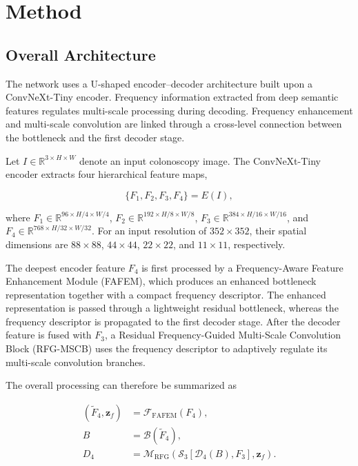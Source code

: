 \section{Method}

\subsection{Overall Architecture}

The network uses a U-shaped encoder--decoder architecture built upon a ConvNeXt-Tiny encoder. Frequency information extracted from deep semantic features regulates multi-scale processing during decoding. Frequency enhancement and multi-scale convolution are linked through a cross-level connection between the bottleneck and the first decoder stage.

Let $I \in \mathbb{R}^{3\times H\times W}$ denote an input colonoscopy image. The ConvNeXt-Tiny encoder extracts four hierarchical feature maps,

\begin{equation}
\{F_1,F_2,F_3,F_4\}=E(I),
\label{eq:encoder_features}
\end{equation}

where $F_1\in\mathbb{R}^{96\times H/4\times W/4}$, $F_2\in\mathbb{R}^{192\times H/8\times W/8}$, $F_3\in\mathbb{R}^{384\times H/16\times W/16}$, and $F_4\in\mathbb{R}^{768\times H/32\times W/32}$. For an input resolution of $352\times352$, their spatial dimensions are $88\times88$, $44\times44$, $22\times22$, and $11\times11$, respectively.

The deepest encoder feature $F_4$ is first processed by a Frequency-Aware Feature Enhancement Module (FAFEM), which produces an enhanced bottleneck representation together with a compact frequency descriptor. The enhanced representation is passed through a lightweight residual bottleneck, whereas the frequency descriptor is propagated to the first decoder stage. After the decoder feature is fused with $F_3$, a Residual Frequency-Guided Multi-Scale Convolution Block (RFG-MSCB) uses the frequency descriptor to adaptively regulate its multi-scale convolution branches.

The overall processing can therefore be summarized as

\begin{align}
(\widetilde{F}_4,\mathbf{z}_f)
&=\mathcal{F}_{\mathrm{FAFEM}}(F_4),
\label{eq:overall_fafem}\\
B&=\mathcal{B}(\widetilde{F}_4),
\label{eq:overall_bottleneck}\\
D_4&=\mathcal{M}_{\mathrm{RFG}}
\left(
\mathcal{S}_3\left[\mathcal{D}_4(B),F_3\right],
\mathbf{z}_f
\right).
\label{eq:overall_stage3}
\end{align}

